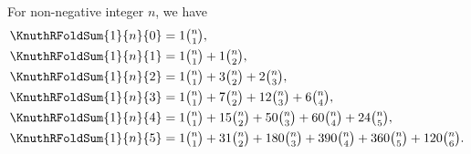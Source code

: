 \begin{example} For non-negative integer $n$, we have
  \begin{align*}
    \KnuthRFoldSum{1}{n}{0} &= 1 \tbinom{n}{1},
    \\
    \KnuthRFoldSum{1}{n}{1} &= 1 \tbinom{n}{1} + 1 \tbinom{n}{2},
    \\
    \KnuthRFoldSum{1}{n}{2} &= 1 \tbinom{n}{1} + 3 \tbinom{n}{2}
    +2   \tbinom{n}{3},
    \\
    \KnuthRFoldSum{1}{n}{3} &= 1 \tbinom{n}{1} + 7 \tbinom{n}{2}
    +12  \tbinom{n}{3} + 6  \tbinom{n}{4},
    \\
    \KnuthRFoldSum{1}{n}{4} &= 1 \tbinom{n}{1} +15 \tbinom{n}{2}
    +50  \tbinom{n}{3} +60  \tbinom{n}{4} + 24 \tbinom{n}{5},
    \\
    \KnuthRFoldSum{1}{n}{5} &= 1 \tbinom{n}{1} +31 \tbinom{n}{2}
    +180 \tbinom{n}{3} +390 \tbinom{n}{4} + 360 \tbinom{n}{5}
    + 120 \tbinom{n}{6}.
  \end{align*}
\end{example}
